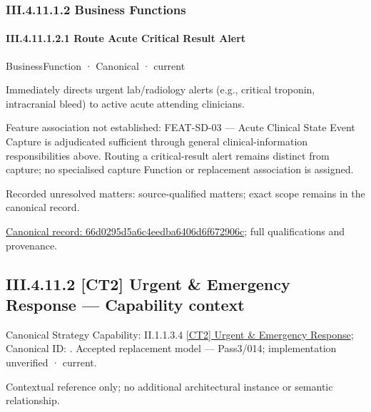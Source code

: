 \subsubsection*{III.4.11.1.2 Business Functions}
\label{navigation:III.4.11.1.2}

\paragraph*{III.4.11.1.2.1 Route Acute Critical Result Alert}
\label{navigation:III.4.11.1.2.1}

\label{element:66d0295d5a6c4eedba6406d6f672906c}
{\small BusinessFunction · Canonical · current}\par

Immediately directs urgent lab/radiology alerts (e.g., critical troponin, intracranial bleed) to active acute attending clinicians.



Feature association not established: FEAT-SD-03 — Acute Clinical State Event Capture is adjudicated sufficient through general clinical-information responsibilities above. Routing a critical-result alert remains distinct from capture; no specialised capture Function or replacement association is assigned.


{\small Recorded unresolved matters: source-qualified matters; exact scope remains in the canonical record.}\par
{\footnotesize \href{../../../../../../../../continuum/business/business-function/66d0295d5a6c4eedba6406d6f672906c.md}{Canonical record: 66d0295d5a6c4eedba6406d6f672906c}; full qualifications and provenance.}\par
\subsection*{III.4.11.2 [CT2] Urgent \& Emergency Response — Capability context}
\label{navigation:III.4.11.2}

{\small Canonical Strategy Capability: II.1.1.3.4 \hyperref[element:d6c40bcfc84a4b758530edcaabfbd0ca]{[CT2] Urgent \& Emergency Response}; Canonical ID: \texttt{}. Accepted replacement model — Pass3/014; implementation unverified · current.}\par
Contextual reference only; no additional architectural instance or semantic relationship.\par
